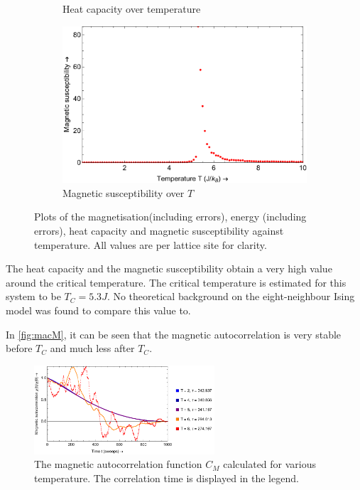 \documentclass[a4paper]{article}
\begin{document}
\begin{figure}[H]
\begin{subfigure}[b]{0.4\textwidth}
		\caption{Heat capacity over temperature}
	\end{subfigure}%
	\begin{subfigure}[b]{0.4\textwidth}
		\centering
		\includegraphics[width=\textwidth]{magsusplot.pdf}
		\caption{Magnetic susceptibility over $T$}
	\end{subfigure}
	\caption{Plots of the magnetisation(including errors), energy (including errors), heat capacity and magnetic susceptibility against temperature. All values are per lattice site for clarity.}
	\label{fig:metropolis}
\end{figure}

The heat capacity and the magnetic susceptibility obtain a very high value around the critical temperature. The critical temperature is estimated for this system to be $T_C=5.3 J$. No theoretical background on the eight-neighbour Ising model was found to compare this value to.

In \autoref{fig:macM}, it can be seen that the magnetic autocorrelation is very stable before $T_C$ and much less after $T_C$.

\begin{figure}[h]
	\centering
	\includegraphics[width=0.6\textwidth]{macimage.pdf}
	\caption{The magnetic autocorrelation function $C_M$ calculated for various temperature. The correlation time is displayed in the legend.}
	\label{fig:macM}
\end{figure}
\end{document}
